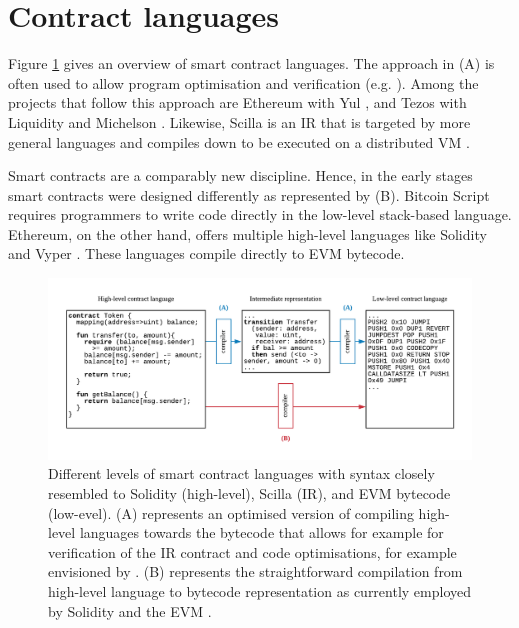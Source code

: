 \section{Contract languages}
\label{languages}

Figure \ref{fig:language} gives an overview of smart contract languages.
The approach in (A) is often used to allow program optimisation and verification (e.g. \cite{Lattner2004}). 
Among the projects that follow this approach are Ethereum with Yul \cite{EthereumFoundation2018IULIA}, and Tezos with Liquidity \cite{OCamlProSAS2018} and Michelson \cite{DynamicLedgerSolutions2017}.
Likewise, Scilla is an IR that is targeted by more general languages and compiles down to be executed on a distributed VM \cite{Sergey2018}.

Smart contracts are a comparably new discipline.
Hence, in the early stages smart contracts were designed differently as represented by (B).
Bitcoin Script \cite{BitcoinWiki2018Script} requires programmers to write code directly in the low-level stack-based language.
Ethereum, on the other hand, offers multiple high-level languages like Solidity \cite{Ethereum2018Solidity} and Vyper \cite{Ethereum2018Vyper}.
These languages compile directly to EVM bytecode. 

\begin{figure}
\label{fig:language}
\includegraphics[width=\textwidth]{fig/Language.pdf}
\caption{Different levels of smart contract languages with syntax closely resembled to Solidity (high-level), Scilla (IR), and EVM bytecode (low-evel). (A) represents an optimised version of compiling high-level languages towards the bytecode that allows for example for verification of the IR contract and code optimisations, for example envisioned by \cite{Sergey2018,OCamlProSAS2018}. (B) represents the straightforward compilation from high-level language to bytecode representation as currently employed by Solidity and the EVM \cite{Ethereum2018Solidity,Wood2014}.}
\end{figure}


